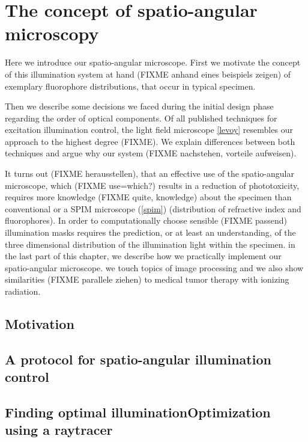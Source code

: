 \chapter{The concept of spatio-angular microscopy}
\label{sec:concept}
\begin{summary}
  Here we introduce our spatio-angular microscope. First we motivate
  the concept of this illumination system at hand (FIXME anhand eines
  beispiels zeigen) of exemplary fluorophore distributions, that occur
  in typical specimen.

  Then we describe some decisions we faced during the initial design
  phase regarding the order of optical components. Of all published
  techniques for excitation illumination control, the light field
  microscope \ref{levoy} resembles our approach to the highest degree
  (FIXME). We explain differences between both techniques and argue
  why our system (FIXME nachstehen, vorteile aufweisen).

  It turns out (FIXME herausstellen), that an effective use of the
  spatio-angular microscope, which (FIXME use=which?) results in a
  reduction of phototoxicity, requires more knowledge (FIXME quite,
  knowledge) about the specimen than conventional or a SPIM microscope
  (\ref{spim}) (distribution of refractive index and fluorophores). In
  order to computationally choose sensible (FIXME passend)
  illumination masks requires the prediction, or at least an
  understanding, of the three dimensional distribution of the
  illumination light within the specimen. in the last part of this
  chapter, we describe how we practically implement our spatio-angular
  microscope. we touch topics of image processing and we also show
  similarities (FIXME parallele ziehen) to medical tumor therapy with
  ionizing radiation.

\end{summary}
\section{Motivation}
\section{A protocol for spatio-angular illumination control}
\section{Finding optimal illuminationOptimization using a raytracer}
